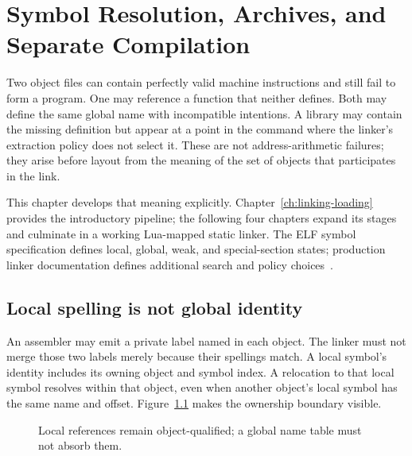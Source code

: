 \chapter{Symbol Resolution, Archives, and Separate Compilation}
\label{ch:link-symbols}

Two object files can contain perfectly valid machine instructions and still fail to form a program.
One may reference a function that neither defines.
Both may define the same global name with incompatible intentions.
A library may contain the missing definition but appear at a point in the command where the linker's extraction policy does not select it.
These are not address-arithmetic failures; they arise before layout from the meaning of the set of objects that participates in the link.

This chapter develops that meaning explicitly.
Chapter~\ref{ch:linking-loading} provides the introductory pipeline; the following four chapters expand its stages and culminate in a working Lua-mapped static linker.
The ELF symbol specification defines local, global, weak, and special-section states; production linker documentation defines additional search and policy choices~\cite{xinuos-2026-elf,gnu-2026-ld}.

\section{Local spelling is not global identity}
\label{sec:ch57-identity}

An assembler may emit a private label named  in each object.
The linker must not merge those two labels merely because their spellings match.
A local symbol's identity includes its owning object and symbol index.
A relocation to that local symbol resolves within that object, even when another object's local symbol has the same name and offset.
Figure~\ref{fig:ch57-local} makes the ownership boundary visible.

\begin{figure}[htbp]
\centering
{}
\caption{Local references remain object-qualified; a global name table must not absorb them.}
\label{fig:ch57-local}
\end{figure}


